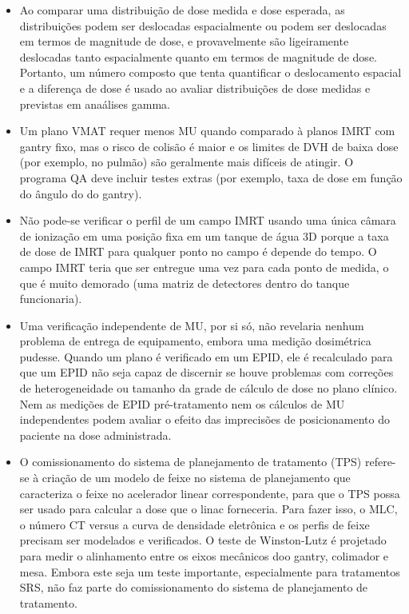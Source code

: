 \documentclass[11pt,a4paper]{article}
\newcounter{exemplo}
\begin{document}
\begin{exemplo}
\begin{itemize}
        \item Ao comparar uma distribuição de dose medida e dose esperada, as distribuições podem ser deslocadas espacialmente ou podem ser deslocadas em termos de magnitude de dose, e provavelmente são ligeiramente deslocadas tanto espacialmente quanto em termos de magnitude de dose. Portanto, um número composto que tenta quantificar o deslocamento espacial e a diferença de dose é usado ao avaliar distribuições de dose medidas e previstas em anaálises gamma. 
        
        \item Um plano VMAT requer menos MU quando comparado à planos IMRT com gantry fixo, mas o risco de colisão é maior e os limites de DVH de baixa dose (por exemplo, no pulmão) são geralmente mais difíceis de atingir. O programa QA deve incluir testes extras (por exemplo, taxa de dose em função do ângulo do do gantry).
        
        \item Não pode-se verificar o perfil de um campo IMRT usando uma única câmara de ionização em uma posição fixa em um tanque de água 3D porque a taxa de dose de IMRT para qualquer ponto no campo é depende do tempo. O campo IMRT teria que ser entregue uma vez para cada ponto de medida, o que é muito demorado (uma matriz de detectores dentro do tanque funcionaria).
        
        \item Uma verificação independente de MU, por si só, não revelaria nenhum problema de entrega de equipamento, embora uma medição dosimétrica pudesse. Quando um plano é verificado em um EPID, ele é recalculado para que um EPID não seja capaz de discernir se houve problemas com correções de heterogeneidade ou tamanho da grade de cálculo de dose no plano clínico. Nem as medições de EPID pré-tratamento nem os cálculos de MU independentes podem avaliar o efeito das imprecisões de posicionamento do paciente na dose administrada.
        
        \item O comissionamento do sistema de planejamento de tratamento (TPS) refere-se à criação de um modelo de feixe no sistema de planejamento que caracteriza o feixe no acelerador linear correspondente, para que o TPS possa ser usado para calcular a dose que o linac forneceria. Para fazer isso, o MLC, o número CT versus a curva de densidade eletrônica e os perfis de feixe precisam ser modelados e verificados. O teste de Winston-Lutz é projetado para medir o alinhamento entre os eixos mecânicos doo gantry, colimador e mesa. Embora este seja um teste importante, especialmente para tratamentos SRS, não faz parte do comissionamento do sistema de planejamento de tratamento.
        

\end{itemize}
\end{exemplo}
\end{document}
